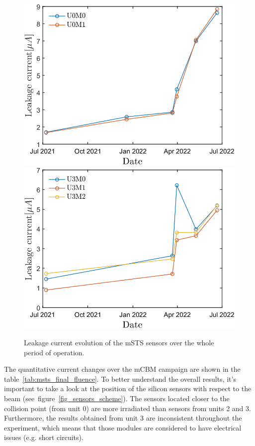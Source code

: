 \begin{figure}[!h]
\centering
\includegraphics[width=0.45\columnwidth]{Chapter6/DCS/images/sensors/U0_leakage.png}
\includegraphics[width=0.45\columnwidth]{Chapter6/DCS/images/sensors/U3_leakage.png}
\caption{Leakage current evolution of the \gls{mSTS} sensors over the whole period of operation.}
\label{fig_leak}
\end{figure}

\newpage
The quantitative current changes over the \gls{mCBM} campaign are shown in the table~\ref{tab:msts_final_fluence}. To better understand the overall results, it's important to take a look at the position of the silicon sensors with respect to the beam (see~figure~\ref{fig_sensors_scheme}). The sensors located closer to the collision point (from unit 0) are more irradiated than sensors from units 2 and 3. Furthermore, the results obtained from unit 3 are inconsistent throughout the experiment, which means that those modules are considered to have electrical issues (e.g. short circuits).


